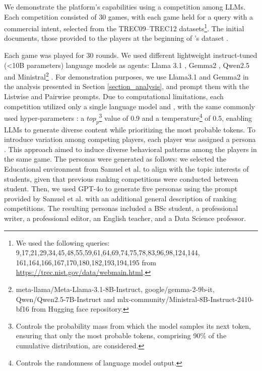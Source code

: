 We demonstrate the platform's capabilities using a competition among LLMs.
Each competition consisted of 30 games, with each game held for a query with a commercial intent, selected from the TREC09–TREC12 datasets\footnote{We used the following queries: 9,17,21,29,34,45,48,55,59,61,64,69,74,75,78,83,96,98,124,144,\\ 161,164,166,167,170,180,182,193,194,195 from \url{https://trec.nist.gov/data/webmain.html}.}. The initial documents, those provided to the players at the beginning of \ASRC's dataset \cite{mordo_search_2025}.

Each game was played for 30 rounds. We used different lightweight instruct-tuned (<10B parameters) language models as agents: Llama 3.1 \cite{dubey_llama_2024}, Gemma2 \cite{gemma_team_gemma_nodate}, Qwen2.5 \cite{qwen_qwen25_2024} and Ministral\footnote{meta-llama/Meta-Llama-3.1-8B-Instruct, google/gemma-2-9b-it, Qwen/Qwen2.5-7B-Instruct and mlx-community/Ministral-8B-Instruct-2410-bf16 from Hugging face repository.} \cite{jiang_mistral_2023}.
For demonstration purposes, we use Llama3.1 and Gemma2 in the analysis presented in Section \ref{section_analysis}, and prompt them with the Listwise and Pairwise prompts. Due to computational limitations, each competition utilized only a single language model and \contextualized{}, with the same commonly used hyper-parameters \cite{li_examining_2024}: a $top_p$\footnote{Controls the probability mass from which the model samples its next token, ensuring that only the most probable tokens, comprising 90\% of the cumulative distribution, are considered.} value of 0.9 and a temperature\footnote{Controls the randomness of language model output.} of 0.5, enabling LLMs to generate diverse content while prioritizing the most probable tokens. To introduce variation among competing players, each player was assigned a persona \cite{shapira_can_2024,samuel_personagym_2024}. This approach aimed to induce diverse behavioral patterns among the players in the same game. The personas were generated as follows: we selected the Educational environment from Samuel et al. \cite{samuel_personagym_2024} to align with the topic interests of students, given that previous ranking competitions were conducted between student. Then, we used GPT-4o to generate five personas using the prompt provided by Samuel et al. \cite{samuel_personagym_2024} with an additional general description of ranking competitions. The resulting personas included a BSc student, a professional writer, a professional editor, an English teacher, and a Data Science professor.

